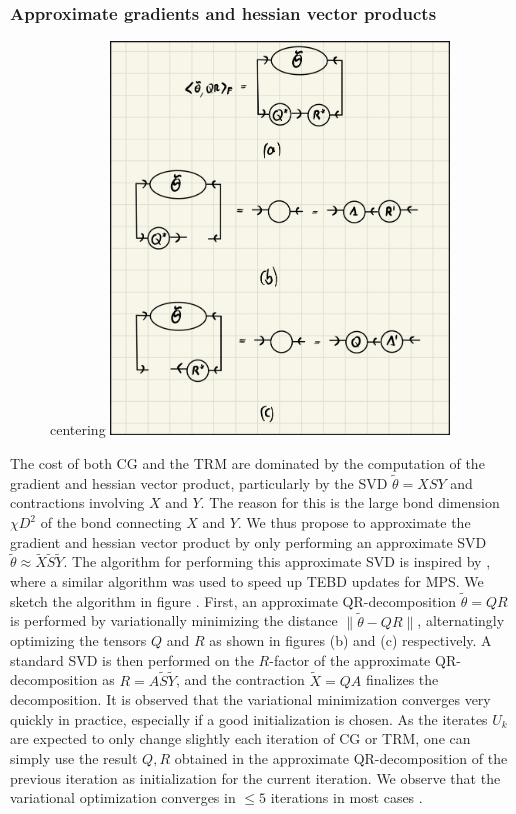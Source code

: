 \subsubsection*{Approximate gradients and hessian vector products}
\begin{figure}
	centering
	\includegraphics[width=0.8\textwidth]{figures/disoTPS/approximate_qr_decomposition.jpeg}
	\caption{}
	\label{fig:approximate_qr_decomposition}
\end{figure}
The cost of both CG and the TRM are dominated by the computation of the gradient and hessian vector product, particularly by the SVD $\tilde{\theta} = XSY$ and contractions involving $X$ and $Y$. The reason for this is the large bond dimension $\chi D^2$ of the bond connecting $X$ and $Y$. We thus propose to approximate the gradient and hessian vector product by only performing an approximate SVD $\tilde{\theta} \approx \tilde{X}\tilde{S}\tilde{Y}$. The algorithm for performing this approximate SVD is inspired by \cite{}, where a similar algorithm was used to speed up TEBD updates for MPS. We sketch the algorithm in figure \figref{}. First, an approximate QR-decomposition $\tilde{\theta} = QR$ is performed by variationally minimizing the distance $\lVert \tilde{\theta} - QR \rVert$, alternatingly optimizing the tensors $Q$ and $R$ as shown in figures (b) and (c) respectively. A standard SVD is then performed on the $R$-factor of the approximate QR-decomposition as $R = A\tilde{S}\tilde{Y}$, and the contraction $\tilde{X} = QA$ finalizes the decomposition. It is observed that the variational minimization converges very quickly in practice, especially if a good initialization is chosen. As the iterates $U_k$ are expected to only change slightly each iteration of CG or TRM, one can simply use the result $Q, R$ obtained in the approximate QR-decomposition of the previous iteration as initialization for the current iteration. We observe that the variational optimization converges in $\le 5$ iterations in most cases .
